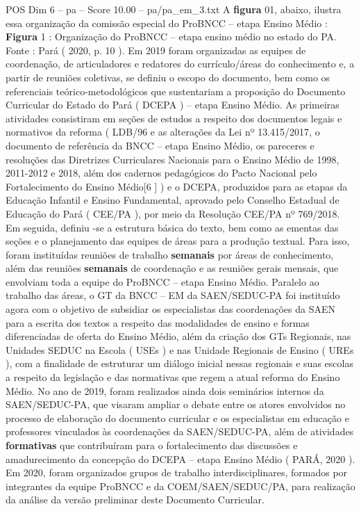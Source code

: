\begin{textsample}{POS Dim 6 – pa – Score 10.00 – pa/pa\_em\_3.txt}
A \textbf{figura} 01, abaixo, ilustra essa organização da comissão especial do ProBNCC – etapa Ensino Médio : \textbf{Figura} 1 : Organização do ProBNCC – etapa ensino médio no estado do PA.
Fonte : Pará ( 2020, p. 10 ).
Em 2019 foram organizadas as equipes de coordenação, de articuladores e redatores do currículo/áreas do conhecimento e, a partir de reuniões coletivas, se definiu o escopo do documento, bem como os referenciais teórico-metodológicos que sustentariam a proposição do Documento Curricular do Estado do Pará ( DCEPA ) – etapa Ensino Médio.
As primeiras atividades consistiram em seções de estudos a respeito dos documentos legais e normativos da reforma ( LDB/96 e as alterações da Lei nº 13.415/2017, o documento de referência da BNCC – etapa Ensino Médio, os pareceres e resoluções das Diretrizes Curriculares Nacionais para o Ensino Médio de 1998, 2011-2012 e 2018, além dos cadernos pedagógicos do Pacto Nacional pelo Fortalecimento do Ensino Médio[6 ] ) e o DCEPA, produzidos para as etapas da Educação Infantil e Ensino Fundamental, aprovado pelo Conselho Estadual de Educação do Pará ( CEE/PA ), por meio da Resolução CEE/PA nº 769/2018.
Em seguida, definiu -se a estrutura básica do texto, bem como as ementas das seções e o planejamento das equipes de áreas para a produção textual.
Para isso, foram instituídas reuniões de trabalho \textbf{semanais} por áreas de conhecimento, além das reuniões \textbf{semanais} de coordenação e as reuniões gerais mensais, que envolviam toda a equipe do ProBNCC – etapa Ensino Médio.
Paralelo ao trabalho das áreas, o GT da BNCC – EM da SAEN/SEDUC-PA foi instituído agora com o objetivo de subsidiar os especialistas das coordenações da SAEN para a escrita dos textos a respeito das modalidades de ensino e formas diferenciadas de oferta do Ensino Médio, além da criação dos GTs Regionais, nas Unidades SEDUC na Escola ( USEs ) e nas Unidade Regionais de Ensino ( UREs ), com a finalidade de estruturar um diálogo inicial nessas regionais e suas escolas a respeito da legislação e das normativas que regem a atual reforma do Ensino Médio.
No ano de 2019, foram realizados ainda dois seminários internos da SAEN/SEDUC-PA, que visaram ampliar o debate entre os atores envolvidos no processo de elaboração do documento curricular e os especialistas em educação e professores vinculados às coordenações da SAEN/SEDUC-PA, além de atividades \textbf{formativas} que contribuíram para o fortalecimento das discussões e amadurecimento da concepção do DCEPA – etapa Ensino Médio ( PARÁ, 2020 ).
Em 2020, foram organizados grupos de trabalho interdisciplinares, formados por integrantes da equipe ProBNCC e da COEM/SAEN/SEDUC/PA, para realização da análise da versão preliminar deste Documento Curricular.

\end{textsample}
